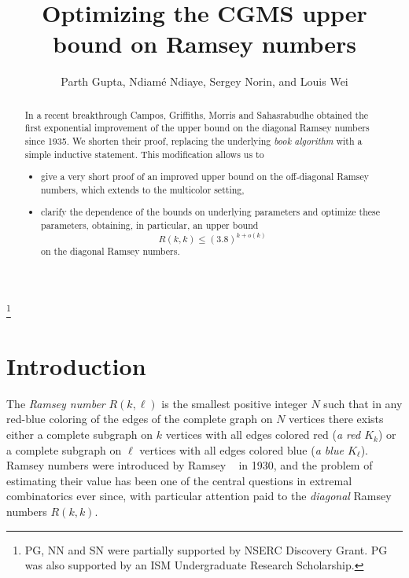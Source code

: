 \documentclass[reqno,final,12pt]{amsart}
\begin{document}
	
\title{Optimizing the CGMS upper bound on Ramsey numbers}
\author{Parth Gupta,		
Ndiam\'e Ndiaye,
Sergey Norin,	
 and Louis Wei }
\address{Department of Mathematics and Statistics, McGill University, Montr\'{e}al, QC, Canada.}
\thanks{PG, NN and SN were partially supported by NSERC Discovery Grant. PG was also supported by an ISM Undergraduate Research Scholarship.
}
\begin{abstract} 
	In a recent breakthrough Campos, Griffiths, Morris and Sahasrabudhe obtained the first exponential improvement of the upper bound on the diagonal Ramsey numbers since 1935. We shorten their proof, replacing the underlying \emph{book algorithm} with a simple inductive statement. This modification allows us to \begin{itemize} \item give a very short proof of an improved upper bound on the off-diagonal Ramsey numbers, which extends to the multicolor setting,
		\item clarify the dependence of the bounds on underlying parameters and optimize these parameters, obtaining, in particular, an upper bound
		$$R(k,k) \leq (3.8)^{k+o(k)}$$ 
		on the diagonal Ramsey numbers.
		\end{itemize}  
\end{abstract}
	\maketitle
	
	
\section{Introduction} The \emph{Ramsey number} $R(k, \ell)$ is the smallest positive integer $N$ such that
in any red-blue coloring of the edges of the complete graph on $N$ vertices there exists either a complete subgraph on $k$ vertices with all edges colored red (\emph{a red $K_k$}) or a complete subgraph on $\ell$ vertices with all edges colored blue (\emph{a blue $K_{\ell}$}).
Ramsey numbers were introduced by Ramsey ~\cite{R30} in 1930, and the problem of estimating their value has been one of the central questions in extremal combinatorics ever since, with particular attention paid to the \emph{diagonal} Ramsey numbers $R(k,k)$.
	
\end{document}
